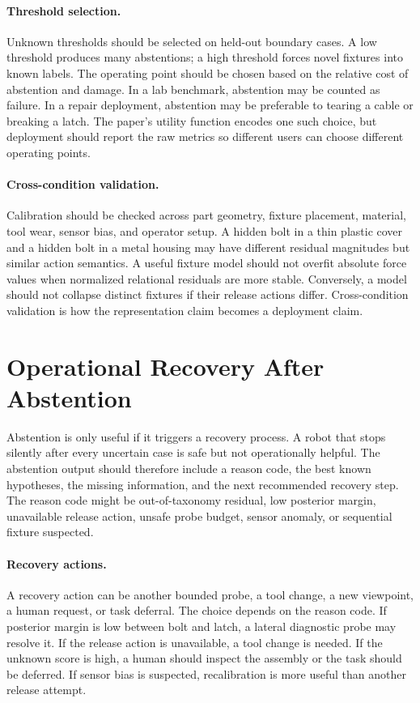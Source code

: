 \documentclass{article}
\begin{document}
\paragraph{Threshold selection.}
Unknown thresholds should be selected on held-out boundary cases. A low
threshold produces many abstentions; a high threshold forces novel fixtures
into known labels. The operating point should be chosen based on the relative
cost of abstention and damage. In a lab benchmark, abstention may be counted as
failure. In a repair deployment, abstention may be preferable to tearing a
cable or breaking a latch. The paper's utility function encodes one such
choice, but deployment should report the raw metrics so different users can
choose different operating points.

\paragraph{Cross-condition validation.}
Calibration should be checked across part geometry, fixture placement,
material, tool wear, sensor bias, and operator setup. A hidden bolt in a thin
plastic cover and a hidden bolt in a metal housing may have different residual
magnitudes but similar action semantics. A useful fixture model should not
overfit absolute force values when normalized relational residuals are more
stable. Conversely, a model should not collapse distinct fixtures if their
release actions differ. Cross-condition validation is how the representation
claim becomes a deployment claim.

\section{Operational Recovery After Abstention}

Abstention is only useful if it triggers a recovery process. A robot that
stops silently after every uncertain case is safe but not operationally
helpful. The abstention output should therefore include a reason code, the
best known hypotheses, the missing information, and the next recommended
recovery step. The reason code might be out-of-taxonomy residual, low posterior
margin, unavailable release action, unsafe probe budget, sensor anomaly, or
sequential fixture suspected.

\paragraph{Recovery actions.}
A recovery action can be another bounded probe, a tool change, a new viewpoint,
a human request, or task deferral. The choice depends on the reason code. If
posterior margin is low between bolt and latch, a lateral diagnostic probe may
resolve it. If the release action is unavailable, a tool change is needed. If
the unknown score is high, a human should inspect the assembly or the task
should be deferred. If sensor bias is suspected, recalibration is more useful
than another release attempt.
\end{document}
